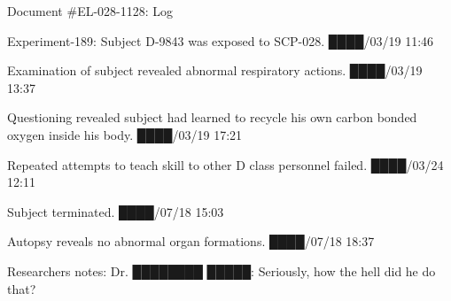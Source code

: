Document \#EL-028-1128: Log

Experiment-189: Subject D-9843 was exposed to SCP-028. ████/03/19 11:46

Examination of subject revealed abnormal respiratory actions. ████/03/19 13:37

Questioning revealed subject had learned to recycle his own carbon bonded oxygen inside his body. ████/03/19 17:21

Repeated attempts to teach skill to other D class personnel failed. ████/03/24 12:11

Subject terminated. ████/07/18 15:03

Autopsy reveals no abnormal organ formations. ████/07/18 18:37

Researchers notes: Dr. ████████ █████: Seriously, how the hell did he do that?